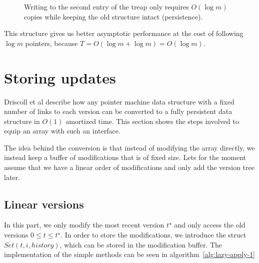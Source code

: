 \documentclass[11pt,a4paper,twoside,openright]{Thesis}
\theoremstyle{definition}
\newcommand{\figlabel}[1]{\label{fig:#1}}
\begin{document}
\begin{figure}
\caption[Treap for history storage]{\figlabel{treap}Writing to the second entry of the treap only requires
$O(\log m)$ copies while keeping the old structure intact (persistence).}
\end{figure}

This structure gives us better asymptotic performance at the cost of 
following $\log m$ pointers, because $T = O(\log m + \log m) = O(\log m)$.

\section{Storing updates}
Driscoll et al\cite{Dris89a} describe how any pointer machine data structure 
with a fixed number of links to each version can be converted to a fully 
persistent data structure in $O(1)$ amortized time. This section shows 
the steps involved to equip an array with such an interface.

The idea behind the conversion is that instead of modifying the array 
directly, we instead keep a buffer of modifications that is of fixed 
size. Lets for the moment assume that we have a linear order of modifications 
and only add the version tree later.

\subsection{Linear versions}
In this part, we only modify the most recent version $t^\star$ and only 
access the old versions $0 \leq t \leq t^\star$. In order to store the 
modifications, we introduce the struct $Set(t, i, history)$, which can be stored 
in the modification buffer. The implementation of the simple methods can be 
seen in algorithm~\ref{alg:lazy-apply-1}
\end{document}
